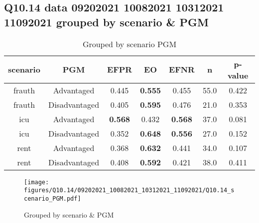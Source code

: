 \subsection{Q10.14 data 09202021 10082021 10312021 11092021 grouped by scenario \& PGM}

\begin{comment}
                             EFPR        EO      EFNR     n    pvalue
(frauth, Advantaged)     0.445455  0.554545  0.454545  55.0  0.421700
(frauth, Disadvantaged)  0.404762  0.595238  0.476190  21.0  0.353111
(icu, Advantaged)        0.567568  0.432432  0.567568  37.0  0.080939
(icu, Disadvantaged)     0.351852  0.648148  0.555556  27.0  0.151616
(rent, Advantaged)       0.367647  0.632353  0.441176  34.0  0.107199
(rent, Disadvantaged)    0.407895  0.592105  0.421053  38.0  0.410782
\end{comment}

\begin{table}[h]
    \centering
    \begin{tabular}{|c|c|c|c|c|c|c|}
        \hline
        scenario & PGM & EFPR & EO & EFNR & n & p-value\\
        \hline
        frauth & Advantaged & 0.445 & \textbf{0.555} & 0.455 & 55.0 & 0.422\\
		frauth & Disadvantaged & 0.405 & \textbf{0.595} & 0.476 & 21.0 & 0.353\\
		icu & Advantaged & \textbf{0.568} & 0.432 & \textbf{0.568} & 37.0 & 0.081\\
		icu & Disadvantaged & 0.352 & \textbf{0.648} & \textbf{0.556} & 27.0 & 0.152\\
		rent & Advantaged & 0.368 & \textbf{0.632} & 0.441 & 34.0 & 0.107\\
		rent & Disadvantaged & 0.408 & \textbf{0.592} & 0.421 & 38.0 & 0.411\\
		
        \hline
    \end{tabular}
    \caption{Grouped by scenario PGM}
    \label{tab:my_label}
\end{table}
\begin{figure}[h]
    \centering
    \texttt{[image: figures/Q10.14/09202021\_10082021\_10312021\_11092021/Q10.14\_scenario\_PGM.pdf]}
    \caption{Grouped by scenario \& PGM}
    \label{fig:my_label}
\end{figure}
